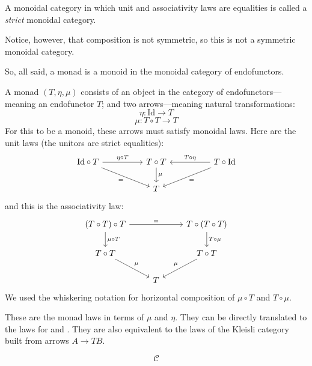 \documentclass[DaoFP]{subfiles}
\begin{document}
A monoidal category in which unit and associativity laws are equalities is called a \emph{strict} monoidal category.

Notice, however, that composition is not symmetric, so this is not a symmetric monoidal category.

So, all said, a monad is a monoid in the monoidal category of endofunctors. 

A monad $(T, \eta, \mu)$ consists of an object in the category of endofunctors---meaning an endofunctor $T$; and two arrows---meaning natural transformations:
\[ \eta \colon \text{Id} \to T \]
\[ \mu \colon T \circ T \to T \]
For this to be a monoid, these arrows must satisfy monoidal laws. Here are the unit laws (the unitors are strict equalities):
\[
 \begin{tikzcd}
\text{Id} \circ T
 \arrow[rr, "\eta \circ T"]
 \arrow[rrd, "="']
& & T \circ T
 \arrow[d, "\mu"]
&& T \circ \text{Id}
 \arrow[ll, "T \circ \eta"']
 \arrow[lld, "="]
 \\
 && T
  \end{tikzcd}
\]
and this is the associativity law:
\[
 \begin{tikzcd}
 (T \circ T) \circ T 
 \arrow[rr, "="]
 \arrow[d, "\mu \circ T"]
 &&
 T \circ (T \circ T)
 \arrow[d, "T \circ \mu"]
 \\
 T \circ T 
 \arrow[dr, "\mu"]
& & T \circ T
 \arrow[dl, "\mu"']
 \\
&  T
 \end{tikzcd}
\]
We used the whiskering notation for horizontal composition of $\mu \circ T$ and $T \circ \mu$.

These are the monad laws in terms of $\mu$ and $\eta$. They can be directly translated to the laws for  and . They are also equivalent to the laws of the Kleisli category built from arrows $A \to T B$.

\[   \mathcal{C} \]
\end{document}
